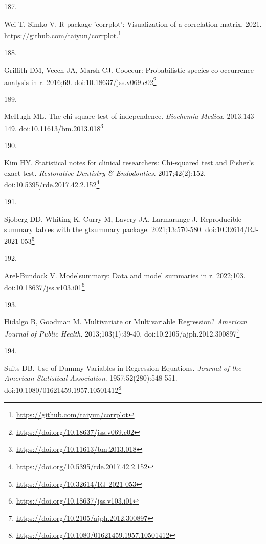 \documentclass[
  a4paper,
]{book}
\newlength{\cslhangindent}
\newlength{\csllabelwidth}
\newlength{\cslentryspacingunit} %
\newenvironment{CSLReferences}[2] %
 {%
  \setlength{\parindent}{0pt}
  \ifodd #1
  \let\oldpar\par
  \def\par{\hangindent=\cslhangindent\oldpar}
  \fi
  \setlength{\parskip}{#2\cslentryspacingunit}
 }%
 {}
\newcommand{\CSLLeftMargin}[1]{\parbox[t]{\csllabelwidth}{#1}}
\newcommand{\CSLRightInline}[1]{\parbox[t]{\linewidth - \csllabelwidth}{#1}\break}
\renewcommand{\href}[2]{#2\footnote{\url{#1}}}
\begin{document}
\begin{CSLReferences}{0}{0}
\leavevmode{}%
\CSLLeftMargin{187. }%
\CSLRightInline{Wei T, Simko V. R package 'corrplot': Visualization of a correlation matrix. 2021. \href{https://github.com/taiyun/corrplot}{https://github.com/taiyun/corrplot.}}

\leavevmode{}%
\CSLLeftMargin{188. }%
\CSLRightInline{Griffith DM, Veech JA, Marsh CJ. {\textbraceleft}Cooccur{\textbraceright}: Probabilistic species co-occurrence analysis in {\textbraceleft}r{\textbraceright}. 2016;69. doi:\href{https://doi.org/10.18637/jss.v069.c02}{10.18637/jss.v069.c02}}

\leavevmode{}%
\CSLLeftMargin{189. }%
\CSLRightInline{McHugh ML. The chi-square test of independence. \emph{Biochemia Medica}. 2013:143-149. doi:\href{https://doi.org/10.11613/bm.2013.018}{10.11613/bm.2013.018}}

\leavevmode{}%
\CSLLeftMargin{190. }%
\CSLRightInline{Kim HY. Statistical notes for clinical researchers: Chi-squared test and Fisher's exact test. \emph{Restorative Dentistry \& Endodontics}. 2017;42(2):152. doi:\href{https://doi.org/10.5395/rde.2017.42.2.152}{10.5395/rde.2017.42.2.152}}

\leavevmode{}%
\CSLLeftMargin{191. }%
\CSLRightInline{Sjoberg DD, Whiting K, Curry M, Lavery JA, Larmarange J. Reproducible summary tables with the gtsummary package. 2021;13:570-580. doi:\href{https://doi.org/10.32614/RJ-2021-053}{10.32614/RJ-2021-053}}

\leavevmode{}%
\CSLLeftMargin{192. }%
\CSLRightInline{Arel-Bundock V. {\textbraceleft}Modelsummary{\textbraceright}: Data and model summaries in {\textbraceleft}r{\textbraceright}. 2022;103. doi:\href{https://doi.org/10.18637/jss.v103.i01}{10.18637/jss.v103.i01}}

\leavevmode{}%
\CSLLeftMargin{193. }%
\CSLRightInline{Hidalgo B, Goodman M. Multivariate or Multivariable Regression? \emph{American Journal of Public Health}. 2013;103(1):39-40. doi:\href{https://doi.org/10.2105/ajph.2012.300897}{10.2105/ajph.2012.300897}}

\leavevmode{}%
\CSLLeftMargin{194. }%
\CSLRightInline{Suits DB. Use of Dummy Variables in Regression Equations. \emph{Journal of the American Statistical Association}. 1957;52(280):548-551. doi:\href{https://doi.org/10.1080/01621459.1957.10501412}{10.1080/01621459.1957.10501412}}


\end{CSLReferences}
\end{document}
